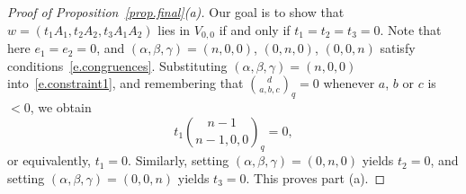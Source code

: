 \documentclass[12pt]{amsart}
\numberwithin{equation}{section}
\numberwithin{subsection}{section}
\theoremstyle{definition} \newtheorem{definition}[theorem]{Definition}
\begin{document}
\begin{proof}[Proof of Proposition~\ref{prop.final}(a)]
Our goal is to show that $w = (t_1 A_1, t_2 A_2, t_3 A_1 A_2)$ lies
in $V_{0, 0}$ if and only if 
$t_1 = t_2 = t_3 = 0$.  Note that here $e_1 = e_2 = 0$, 
and $(\alpha, \beta, \gamma) = (n, 0, 0)$, 
$(0, n, 0)$, $(0, 0, n)$ satisfy conditions~\eqref{e.congruences}. 
Substituting $(\alpha, \beta, \gamma) = (n, 0, 0)$
into~\eqref{e.constraint1}, and remembering that
{\Large $\binom{d}{a, b, c}_q$}$ = 0$ whenever $a$, $b$ 
or $c$ is $< 0$, we obtain
\[ t_1 \binom{n - 1}{n-1, 0, 0}_q = 0, \] or equivalently, $t_1 = 0$.  
Similarly, setting $(\alpha, \beta, \gamma) = (0, n, 0)$ yields
$t_2 = 0$, and setting $(\alpha, \beta, \gamma) = (0, 0, n)$ yields
$t_3 = 0$. This proves part (a).
\end{proof}
\end{document}
